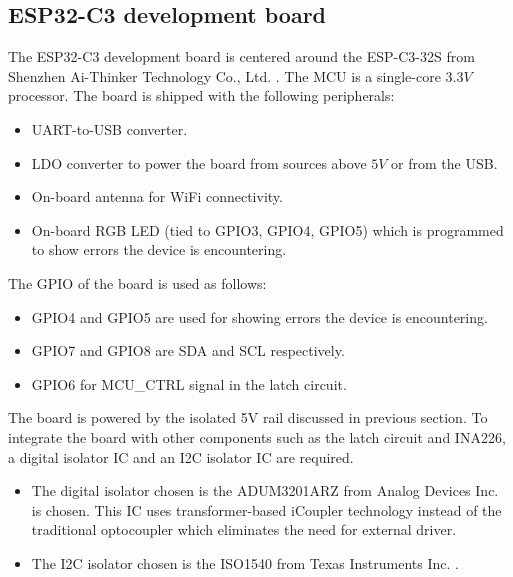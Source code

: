 \documentclass[../main.tex]{subfiles}
\begin{document}
    \pagebreak
    \subsection{ESP32-C3 development board}

    \justify
    The ESP32-C3 development board is centered around the ESP-C3-32S from Shenzhen Ai-Thinker Technology Co., Ltd. \cite{ESP32}. The MCU is a single-core $3.3V$ processor. The board is shipped with the following peripherals:
    \begin{itemize}
        \item UART-to-USB converter.
        \item LDO converter to power the board from sources above $5V$ or from the USB.
        \item On-board antenna for WiFi connectivity.
        \item On-board RGB LED (tied to GPIO3, GPIO4, GPIO5) which is programmed to show errors the device is encountering.
    \end{itemize}

    \justify
    The GPIO of the board is used as follows:
    \begin{itemize}
        \item GPIO4 and GPIO5 are used for showing errors the device is encountering.
        \item GPIO7 and GPIO8 are SDA and SCL respectively.
        \item GPIO6 for MCU\_CTRL signal in the latch circuit.
    \end{itemize}

    \justify
    The board is powered by the isolated 5V rail discussed in previous section. To integrate the board with other components such as the latch circuit and INA226, a digital isolator IC and an I2C isolator IC are required. 
    \begin{itemize}
        \item The digital isolator chosen is the ADUM3201ARZ from Analog Devices Inc. \cite{ADUM3201} is chosen. This IC uses transformer-based iCoupler technology instead of the traditional optocoupler which eliminates the need for external driver.
        \item The I2C isolator chosen is the ISO1540 from Texas Instruments Inc. \cite{ISO1540}.
    \end{itemize}
    
\end{document}
